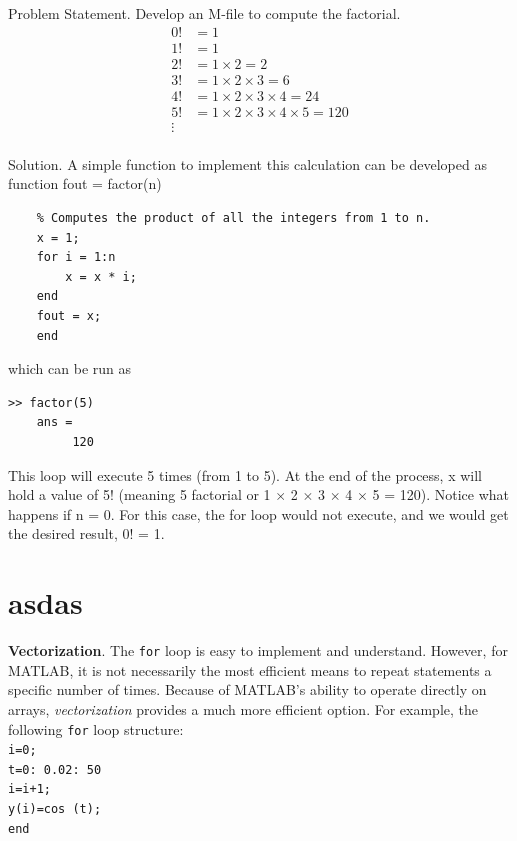 \documentclass[../main.tex]{subfiles}
\begin{document}
Problem Statement. Develop an M-file to compute the factorial.
\[\begin{array}{ll}
    0!& = 1\\
    1!& = 1\\
    2!& = 1 \times 2 = 2\\
    3!& = 1 \times 2 \times 3 = 6\\
    4!& = 1 \times 2 \times 3 \times 4 = 24\\
    5!& = 1 \times 2 \times 3 \times 4 \times 5 = 120\\ 
    \vdots \\
\end{array} \]


Solution. A simple function to implement this calculation can be developed as
function fout = factor(n)
\begin{lstlisting}[frame=none, numbers=none]
    % factor(n):
    % Computes the product of all the integers from 1 to n.
    x = 1;
    for i = 1:n
        x = x * i;
    end
    fout = x;
    end
\end{lstlisting}
which can be run as
\begin{lstlisting}[frame=none, numbers=none]
    >> factor(5)
    ans =
         120
\end{lstlisting}
This loop will execute 5 times (from 1 to 5). At the end of the process, x will hold a value
of 5! (meaning 5 factorial or 1 $\times$ 2 $\times$ 3 $\times$ 4 $\times$ 5 = 120).
Notice what happens if n = 0. For this case, the for loop would not execute, and we
would get the desired result, 0! = 1.

\chapter*{asdas}





\noindent \textbf{Vectorization}. The \texttt{for} loop is easy to implement and understand. However, for MATLAB, it is not necessarily the most efficient means to repeat statements a specific number of times. Because of MATLAB's ability to operate directly on arrays, \emph{vectorization} provides a much more efficient option. For example, the following \texttt{for} loop structure:\\




\texttt{i=0;\\
\indent t=0: 0.02: 50\\
\indent\hspace{2mm} i=i+1;\\
\indent\hspace{2mm} y(i)=cos (t);\\
\indent end}\\
\end{document}
